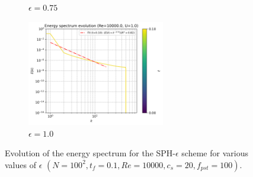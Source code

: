 \begin{figure}[H]
\begin{subfigure}{7cm}
  \caption{$\epsilon = 0.75$}
  \end{subfigure}
  \begin{subfigure}{7cm}
  \centering\includegraphics[width=6cm]{Code-Figures/mon2017/meps/c0_20_tait_pec_dtmul_1_meps_1.0_nx_100_pst_10_re_10000_mon2017/energy_spectrum_evolution.png}
  \caption{$\epsilon = 1.0$}
  \end{subfigure}
  \caption{Evolution of the energy spectrum for the SPH-$\epsilon$ scheme for various values of $\epsilon$ $(N=100^2, t_f=0.1, Re=10000, c_s=20, f_{pst}=100)$.}
  \label{fig:sph-eps-meps-espec}
\end{figure}


